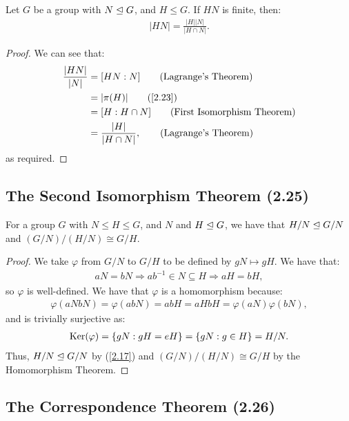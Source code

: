 Let $G$ be a group with $N \trianglelefteq G$, and $H \leq G$.
If $HN$ is finite, then: \begin{align*}
    |HN| = \frac{|H||N|}{|H \cap N|}.
\end{align*}

\begin{proof}
    We can see that: \begin{align*}
        \frac{|HN|}{|N|} 
        &= [HN : N] \tag{Lagrange's Theorem} \\
        &= |\pi(H)| \tag{\ref{2.23}} \\
        &= [H : H \cap N] \tag{First Isomorphism Theorem} \\
        &= \frac{|H|}{|H \cap N|}, \tag{Lagrange's Theorem}
    \end{align*} as required.
\end{proof}

\subsection{The Second Isomorphism Theorem (2.25)} \label{2.25}

For a group $G$ with $N \leq H \leq G$, and $N$ and $H \trianglelefteq G$, we have
that $H / N \trianglelefteq G / N$ and $(G / N) / (H / N) \cong G / H$.

\begin{proof}
    We take $\varphi$ from $G / N$ to $G / H$ to be defined by $gN \mapsto gH$.
    We have that: \begin{align*}
        aN = bN \Longrightarrow ab^{-1} \in N \subseteq H \Longrightarrow aH = bH,
    \end{align*} so $\varphi$ is well-defined. We have that $\varphi$ is a homomorphism
    because: \begin{align*}
        \varphi(aNbN)
        = \varphi(abN)
        = abH
        = aHbH
        = \varphi(aN)\varphi(bN),
    \end{align*} and is trivially surjective as: \begin{align*}
        \operatorname{Ker}(\varphi) 
        = \{gN : gH = eH\}
        = \{gN : g \in H\}
        = H/N.
    \end{align*} Thus, $H / N \trianglelefteq G / N$ by (\ref{2.17}) and
    $(G / N)/(H / N) \cong G / H$ by the Homomorphism Theorem.
\end{proof}

\newpage

\subsection{The Correspondence Theorem (2.26)} \label{2.26}

